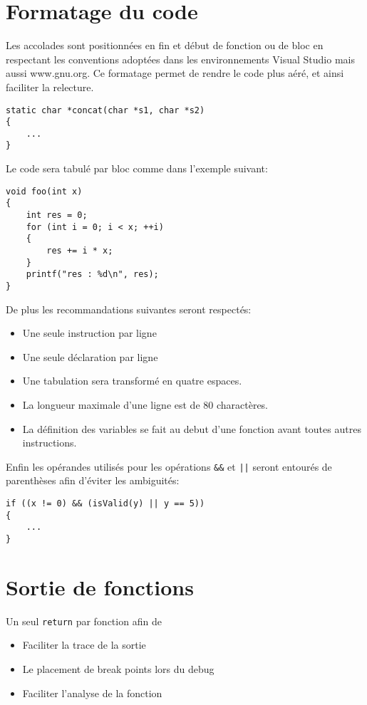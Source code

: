 \section{Formatage du code}
Les accolades sont positionnées en fin et début de fonction ou de bloc en 
respectant les conventions adoptées dans les environnements Visual Studio 
mais aussi www.gnu.org. Ce formatage permet de rendre le code plus aéré, 
et ainsi faciliter la relecture.

\begin{verbatim}
static char *concat(char *s1, char *s2)
{
    ...
}
\end{verbatim}

Le code sera tabulé par bloc comme dans l'exemple suivant:
\begin{verbatim}
void foo(int x)
{
    int res = 0;
    for (int i = 0; i < x; ++i)
    {
        res += i * x;
    }
    printf("res : %d\n", res);
}
\end{verbatim}

De plus les recommandations suivantes seront respectés:
\begin{itemize}
	\item Une seule instruction par ligne
	\item Une seule déclaration par ligne
	\item Une tabulation sera transformé en quatre espaces.	
	\item La longueur maximale d'une ligne est de 80 charactères.
        \item La définition des variables se fait au debut d'une fonction avant
              toutes autres instructions. 
\end{itemize}

Enfin les opérandes utilisés pour les opérations \texttt{&&} et \texttt{||}
seront entourés de parenthèses afin d'éviter les ambiguités:
\begin{verbatim}
if ((x != 0) && (isValid(y) || y == 5))
{
    ...
}
\end{verbatim}

\section{Sortie de fonctions}

Un seul \texttt{return} par fonction afin de
\begin{itemize}
	\item Faciliter la trace de la sortie
	\item Le placement de break points lors du debug
	\item Faciliter l’analyse de la fonction
\end{itemize}

